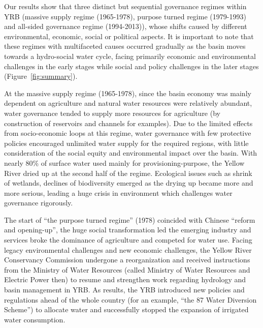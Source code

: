 \documentclass[9pt, twocolumn, twoside, lineno]{pnas-new}
\begin{document}
Our results show that three distinct but sequential governance regimes within YRB (massive supply regime (1965-1978), purpose turned regime (1979-1993) and all-sided governance regime (1994-2013)), whose shifts caused by different environmental, economic, social or political aspects.
It is important to note that these regimes with multifaceted causes occurred gradually as the basin moves towards a hydro-social water cycle, facing primarily economic and environmental challenges in the early stages while social and policy challenges in the later stages (Figure~\ref{fig:summary}).

At the massive supply regime (1965-1978), since the basin economy was mainly dependent on agriculture and natural water resources were relatively abundant, water governance tended to supply more resources for agriculture (by construction of reservoirs and channels for examples). 
Due to the limited effects from socio-economic loops at this regime, water governance with few protective policies encouraged unlimited water supply for the required regions, with little consideration of the social equity and environmental impact over the basin. 
With nearly 80\% of surface water used mainly for provisioning-purpose, the Yellow River dried up at the second half of the regime. 
Ecological issues such as shrink of wetlands, declines of biodiversity emerged as the drying up became more and more serious, leading a huge crisis in environment which challenges water governance rigorously.

The start of ``the purpose turned regime'' (1978) coincided with Chinese ``reform and opening-up'', the huge social transformation led the emerging industry and services broke the dominance of agriculture and competed for water use. 
Facing legacy environmental challenges and new economic challenges, the Yellow River Conservancy Commission undergone a reorganization and received instructions from the Ministry of Water Resources (called Ministry of Water Resources and Electric Power then) to resume and strengthen work regarding hydrology and basin management in YRB.
As results, the YRB introduced new policies and regulations ahead of the whole country (for an example, ``the 87 Water Diversion Scheme'') to allocate water and successfully stopped the expansion of irrigated water consumption.
\end{document}
